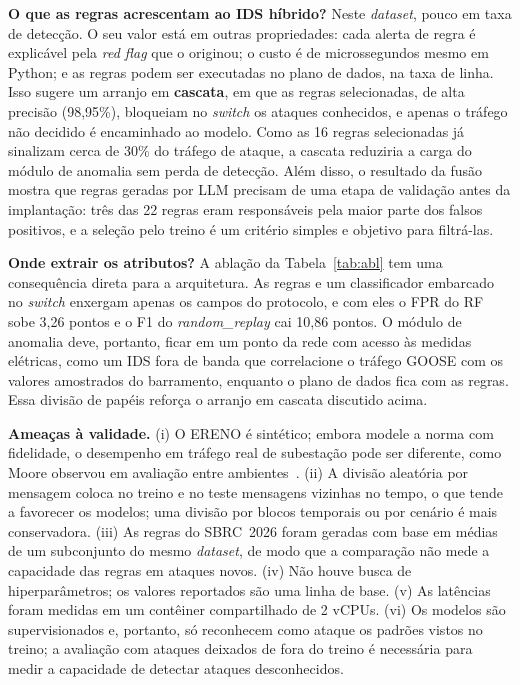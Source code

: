 \documentclass[12pt]{article}
\newcommand{\ataque}[1]{\textit{#1}}
\begin{document}
\textbf{O que as regras acrescentam ao IDS híbrido?} Neste \textit{dataset}, pouco em
taxa de detecção. O seu valor está em outras propriedades: cada alerta de regra
é explicável pela \textit{red flag} que o originou; o custo é de microssegundos
mesmo em Python; e as regras podem ser executadas no plano de dados, na taxa de
linha. Isso sugere um arranjo em \textbf{cascata}, em que as regras
selecionadas, de alta precisão (98,95\%), bloqueiam no \textit{switch} os ataques
conhecidos, e apenas o tráfego não decidido é encaminhado ao modelo. Como as 16
regras selecionadas já sinalizam cerca de 30\% do tráfego de ataque, a cascata
reduziria a carga do módulo de anomalia sem perda de detecção. Além disso, o
resultado da fusão mostra que regras geradas por LLM precisam de uma etapa de
validação antes da implantação: três das 22 regras eram responsáveis pela maior
parte dos falsos positivos, e a seleção pelo treino é um critério simples e
objetivo para filtrá-las.

\textbf{Onde extrair os atributos?} A ablação da Tabela~\ref{tab:abl} tem uma
consequência direta para a arquitetura. As regras e um classificador embarcado
no \textit{switch} enxergam apenas os campos do protocolo, e com eles o FPR do RF
sobe 3,26 pontos e o F1 do \ataque{random\_replay} cai 10,86 pontos. O módulo de
anomalia deve, portanto, ficar em um ponto da rede com acesso às medidas
elétricas, como um IDS fora de banda que correlacione o tráfego GOOSE com os
valores amostrados do barramento, enquanto o plano de dados fica com as regras.
Essa divisão de papéis reforça o arranjo em cascata discutido acima.

\textbf{Ameaças à validade.} (i) O ERENO é sintético; embora modele a norma com
fidelidade, o desempenho em tráfego real de subestação pode ser diferente,
como Moore observou em avaliação entre ambientes~\cite{moore2026anomaly}.
(ii) A divisão aleatória por mensagem coloca no treino e no teste mensagens
vizinhas no tempo, o que tende a favorecer os modelos; uma divisão por
blocos temporais ou por cenário é mais conservadora. (iii) As regras do
SBRC~2026 foram geradas com base em médias de um subconjunto do mesmo \textit{dataset},
de modo que a comparação não mede a capacidade das regras em ataques novos.
(iv) Não houve busca de hiperparâmetros; os valores reportados são uma linha de
base. (v) As latências foram medidas em um contêiner compartilhado de 2 vCPUs. (vi) Os modelos são
supervisionados e, portanto, só reconhecem como ataque os padrões vistos no
treino; a avaliação com ataques deixados de fora do treino é necessária para
medir a capacidade de detectar ataques desconhecidos.
\end{document}
